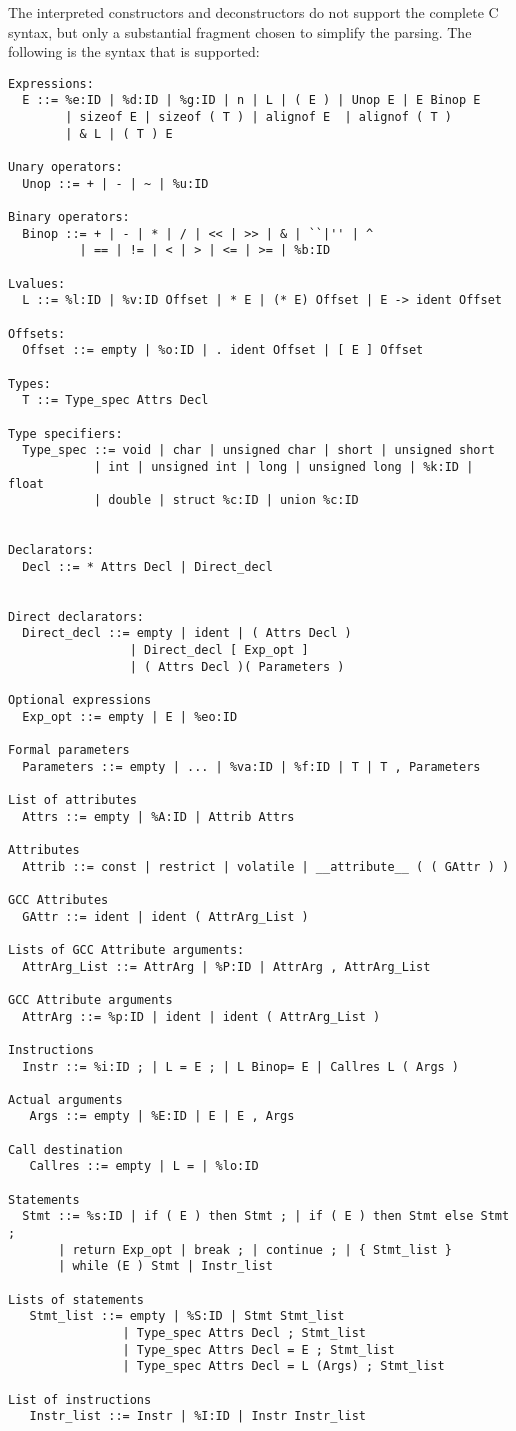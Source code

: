 \documentclass[letterpaper]{article}
\begin{document}
 The interpreted constructors and deconstructors do not support the complete C
syntax, but only a substantial fragment chosen to simplify the parsing. The
following is the syntax that is supported:
\begin{verbatim}
Expressions:
  E ::= %e:ID | %d:ID | %g:ID | n | L | ( E ) | Unop E | E Binop E 
        | sizeof E | sizeof ( T ) | alignof E  | alignof ( T ) 
        | & L | ( T ) E 

Unary operators:
  Unop ::= + | - | ~ | %u:ID

Binary operators:
  Binop ::= + | - | * | / | << | >> | & | ``|'' | ^ 
          | == | != | < | > | <= | >= | %b:ID

Lvalues:
  L ::= %l:ID | %v:ID Offset | * E | (* E) Offset | E -> ident Offset 

Offsets:
  Offset ::= empty | %o:ID | . ident Offset | [ E ] Offset

Types:
  T ::= Type_spec Attrs Decl

Type specifiers:
  Type_spec ::= void | char | unsigned char | short | unsigned short
            | int | unsigned int | long | unsigned long | %k:ID | float 
            | double | struct %c:ID | union %c:ID 


Declarators:
  Decl ::= * Attrs Decl | Direct_decl


Direct declarators:
  Direct_decl ::= empty | ident | ( Attrs Decl ) 
                 | Direct_decl [ Exp_opt ]
                 | ( Attrs Decl )( Parameters )

Optional expressions
  Exp_opt ::= empty | E | %eo:ID

Formal parameters
  Parameters ::= empty | ... | %va:ID | %f:ID | T | T , Parameters

List of attributes
  Attrs ::= empty | %A:ID | Attrib Attrs

Attributes
  Attrib ::= const | restrict | volatile | __attribute__ ( ( GAttr ) )

GCC Attributes
  GAttr ::= ident | ident ( AttrArg_List )

Lists of GCC Attribute arguments:
  AttrArg_List ::= AttrArg | %P:ID | AttrArg , AttrArg_List

GCC Attribute arguments  
  AttrArg ::= %p:ID | ident | ident ( AttrArg_List )

Instructions
  Instr ::= %i:ID ; | L = E ; | L Binop= E | Callres L ( Args )

Actual arguments
   Args ::= empty | %E:ID | E | E , Args

Call destination
   Callres ::= empty | L = | %lo:ID

Statements
  Stmt ::= %s:ID | if ( E ) then Stmt ; | if ( E ) then Stmt else Stmt ;
       | return Exp_opt | break ; | continue ; | { Stmt_list } 
       | while (E ) Stmt | Instr_list 

Lists of statements
   Stmt_list ::= empty | %S:ID | Stmt Stmt_list  
                | Type_spec Attrs Decl ; Stmt_list
                | Type_spec Attrs Decl = E ; Stmt_list
                | Type_spec Attrs Decl = L (Args) ; Stmt_list

List of instructions
   Instr_list ::= Instr | %I:ID | Instr Instr_list
\end{verbatim}
\end{document}
